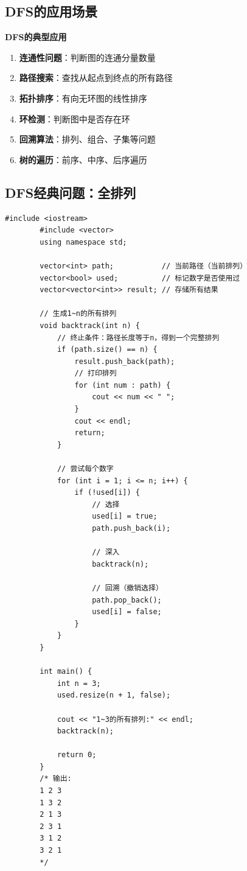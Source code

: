 \documentclass[12pt,a4paper]{article}
\begin{document}
	\subsection{DFS的应用场景}
	
	\begin{bluebox}
		\textbf{DFS的典型应用}
		
		\begin{enumerate}
			\item \textbf{连通性问题}：判断图的连通分量数量
			\item \textbf{路径搜索}：查找从起点到终点的所有路径
			\item \textbf{拓扑排序}：有向无环图的线性排序
			\item \textbf{环检测}：判断图中是否存在环
			\item \textbf{回溯算法}：排列、组合、子集等问题
			\item \textbf{树的遍历}：前序、中序、后序遍历
		\end{enumerate}
	\end{bluebox}
	
	\subsection{DFS经典问题：全排列}
	
	\begin{lstlisting}[caption={DFS回溯 - 全排列问题}]
		#include <iostream>
		#include <vector>
		using namespace std;
		
		vector<int> path;           // 当前路径（当前排列）
		vector<bool> used;          // 标记数字是否使用过
		vector<vector<int>> result; // 存储所有结果
		
		// 生成1~n的所有排列
		void backtrack(int n) {
			// 终止条件：路径长度等于n，得到一个完整排列
			if (path.size() == n) {
				result.push_back(path);
				// 打印排列
				for (int num : path) {
					cout << num << " ";
				}
				cout << endl;
				return;
			}
			
			// 尝试每个数字
			for (int i = 1; i <= n; i++) {
				if (!used[i]) {
					// 选择
					used[i] = true;
					path.push_back(i);
					
					// 深入
					backtrack(n);
					
					// 回溯（撤销选择）
					path.pop_back();
					used[i] = false;
				}
			}
		}
		
		int main() {
			int n = 3;
			used.resize(n + 1, false);
			
			cout << "1~3的所有排列:" << endl;
			backtrack(n);
			
			return 0;
		}
		/* 输出:
		1 2 3
		1 3 2
		2 1 3
		2 3 1
		3 1 2
		3 2 1
		*/
	\end{lstlisting}
	
\end{document}
